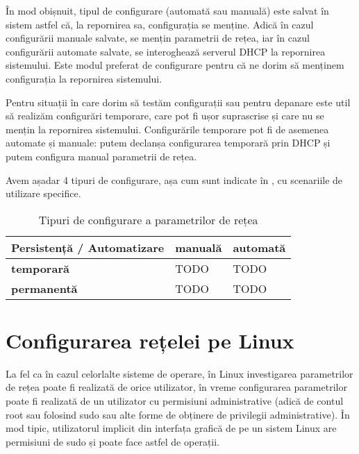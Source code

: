 În mod obișnuit, tipul de configurare (automată sau manuală) este salvat în sistem astfel că, la repornirea sa, configurația se menține. Adică în cazul configurării manuale salvate, se mențin parametrii de rețea, iar în cazul configurării automate salvate, se interoghează serverul DHCP la repornirea sistemului. Este modul preferat de configurare pentru că ne dorim să menținem configurația la repornirea sistemului.

Pentru situații în care dorim să testăm configurații sau pentru depanare este util să realizăm configurări temporare, care pot fi ușor suprascrise și care nu se mențin la repornirea sistemului. Configurările temporare pot fi de asemenea automate și manuale: putem declanșa configurarea temporară prin DHCP și putem configura manual parametrii de rețea.

Avem așadar 4 tipuri de configurare, așa cum sunt indicate în , cu scenariile de utilizare specifice.

\begin{table}[!htb]
  \caption{Tipuri de configurare a parametrilor de rețea}
  \begin{center}
    \begin{tabular}{ p{} p{} p{} }
      \toprule
        \textbf{Persistență / Automatizare} &
        \textbf{manuală} &
        \textbf{automată} \\
      \midrule
        \textbf{temporară} &
        TODO &
        TODO \\

        \textbf{permanentă} &
        TODO &
        TODO \\
      \bottomrule
    \end{tabular}
    \label{tab:net:config-types}
  \end{center}
\end{table}

\section{Configurarea rețelei pe Linux}
\label{sec:net:config-linux}

La fel ca în cazul celorlalte sisteme de operare, în Linux investigarea parametrilor de rețea poate fi realizată de orice utilizator, în vreme configurarea parametrilor poate fi realizată de un utilizator cu permisiuni administrative (adică de contul root sau folosind sudo sau alte forme de obținere de privilegii administrative). În mod tipic, utilizatorul implicit din interfața grafică de pe un sistem Linux are permisiuni de sudo și poate face astfel de operații.

